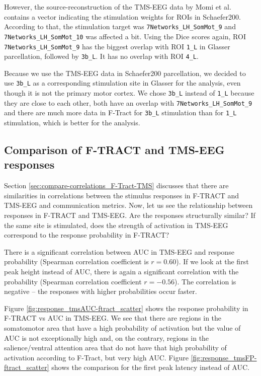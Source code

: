 However, the source-reconstruction of the TMS-EEG data by Momi et al. \cite{momi_tms-evoked_2023} contains a vector indicating the stimulation weights for ROIs in Schaefer200. According to that, the stimulation target was \texttt{7Networks\_LH\_SomMot\_9} and \texttt{7Networks\_LH\_SomMot\_10} was affected a bit. Using the Dice scores again, ROI \texttt{7Networks\_LH\_SomMot\_9} has the biggest overlap with ROI \texttt{1\_L} in Glasser parcellation, followed by \texttt{3b\_L}. It has no overlap with ROI \texttt{4\_L}.

Because we use the TMS-EEG data in Schaefer200 parcellation, we decided to use \texttt{3b\_L} as a corresponding stimulation site in Glasser for the analysis, even though it is not the primary motor cortex. We chose \texttt{3b\_L} instead of \texttt{1\_L} because they are close to each other, both have an overlap with \texttt{7Networks\_LH\_SomMot\_9} and there are much more data in F-Tract for \texttt{3b\_L} stimulation than for \texttt{1\_L} stimulation, which is better for the analysis. 

\subsection{Comparison of F-TRACT and TMS-EEG responses}

Section \ref{sec:compare-correlations_F-Tract-TMS} discusses that there are similarities in correlations between the stimulus responses in F-TRACT and TMS-EEG and communication metrics. Now, let us see the relationship between responses in F-TRACT and TMS-EEG. Are the responses structurally similar? If the same site is stimulated, does the strength of activation in TMS-EEG correspond to the response probability in F-TRACT?

There is a significant correlation between AUC in TMS-EEG and response probability (Spearman correlation coefficient is $r=0.60$). If we look at the first peak height instead of AUC, there is again a significant correlation with the probability (Spearman correlation coefficient $r=-0.56$). The correlation is negative -- the responses with higher probabilities occur faster. 

Figure \ref{fig:response_tmsAUC-ftract_scatter} shows the response probability in F-TRACT vs AUC in TMS-EEG. We see that there are regions in the somatomotor area that have a high probability of activation but the value of AUC is not exceptionally high and, on the contrary, regions in the salience/ventral attention area that do not have that high probability of activation according to F-Tract, but very high AUC. Figure \ref{fig:response_tmsFP-ftract_scatter} shows the comparison for the first peak latency instead of AUC. 

